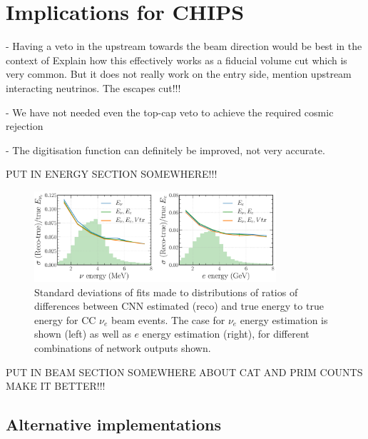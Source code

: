 \chapter{Implications for CHIPS}
\label{chap:implications}

- Having a veto in the upstream towards the beam direction would be best in the context of Explain
how this effectively works as a fiducial volume cut which is very common. But it does not really
work on the entry side, mention upstream interacting neutrinos. The escapes cut!!!

- We have not needed even the top-cap veto to achieve the required cosmic rejection

- The digitisation function can definitely be improved, not very accurate.

PUT IN ENERGY SECTION SOMEWHERE!!!

\begin{figure} %
    \includegraphics[width=0.8\textwidth]{diagrams/6-cvn/chipsnet/energy_multi_frac_vs_e.pdf}
    \caption[Standard deviations of fits to $\nu_{e}$ energy distributions for different network output combinations.]
    {Standard deviations of fits made to distributions of ratios of differences between CNN
        estimated (reco) and true energy to true energy for CC $\nu_{e}$ beam events. The case for
        $\nu_{e}$ energy estimation is shown (left) as well as $e$ energy estimation (right), for
        different combinations of network outputs shown.}
    \label{fig:energy_multi_frac_vs_e}
\end{figure}

PUT IN BEAM SECTION SOMEWHERE ABOUT CAT AND PRIM COUNTS MAKE IT BETTER!!!

\section{Alternative implementations} %
\label{sec:cvn_alt} %

